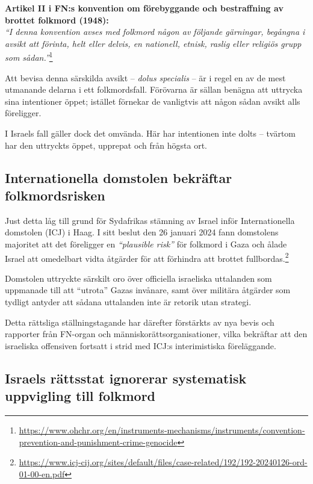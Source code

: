 \documentclass[12pt]{article}
\begin{document}
\textbf{Artikel II i FN:s konvention om förebyggande och bestraffning av brottet folkmord (1948):}\\
\textit{“I denna konvention avses med folkmord någon av följande gärningar, begångna i avsikt att förinta, helt eller delvis, en nationell, etnisk, raslig eller religiös grupp som sådan.”}\footnote{\url{https://www.ohchr.org/en/instruments-mechanisms/instruments/convention-prevention-and-punishment-crime-genocide}}

Att bevisa denna särskilda avsikt – \textit{dolus specialis} – är i regel en av de mest utmanande delarna i ett folkmordsfall. Förövarna är sällan benägna att uttrycka sina intentioner öppet; istället förnekar de vanligtvis att någon sådan avsikt alls föreligger. 

I Israels fall gäller dock det omvända. Här har intentionen inte dolts – tvärtom har den uttryckts öppet, upprepat och från högsta ort.

\subsection{Internationella domstolen bekräftar folkmordsrisken}

Just detta låg till grund för Sydafrikas stämning av Israel inför Internationella domstolen (ICJ) i Haag. I sitt beslut den 26 januari 2024 fann domstolens majoritet att det föreligger en \textit{“plausible risk”} för folkmord i Gaza och ålade Israel att omedelbart vidta åtgärder för att förhindra att brottet fullbordas.\footnote{\url{https://www.icj-cij.org/sites/default/files/case-related/192/192-20240126-ord-01-00-en.pdf}}

Domstolen uttryckte särskilt oro över officiella israeliska uttalanden som uppmanade till att “utrota” Gazas invånare, samt över militära åtgärder som tydligt antyder att sådana uttalanden inte är retorik utan strategi.

Detta rättsliga ställningstagande har därefter förstärkts av nya bevis och rapporter från FN-organ och människorättsorganisationer, vilka bekräftar att den israeliska offensiven fortsatt i strid med ICJ:s interimistiska föreläggande.

\subsection{Israels rättsstat ignorerar systematisk uppvigling till folkmord}
\end{document}

